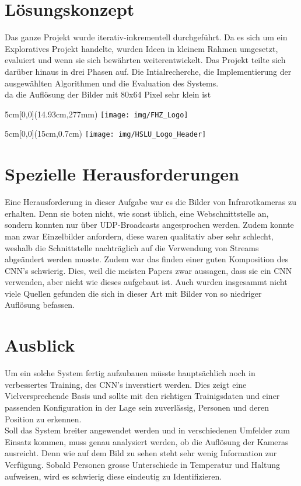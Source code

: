 \documentclass[
	a4paper
]{scrartcl}
\begin{document}
\section{Lösungskonzept}
Das ganze Projekt wurde iterativ-inkrementell durchgeführt. Da es sich um ein Exploratives Projekt handelte, wurden Ideen in kleinem Rahmen umgesetzt, evaluiert und wenn sie sich bewährten weiterentwickelt. Das Projekt teilte sich darüber hinaus in drei Phasen auf. Die Intialrecherche, die Implementierung der ausgewählten Algorithmen und die Evaluation des Systems.\\
da die Auflösung der Bilder mit 80x64 Pixel sehr klein ist 

\begin{textblock*}{5cm}[0,0](14.93cm,277mm)
	\texttt{[image: img/FHZ\_Logo]}
\end{textblock*}

\newpage

\begin{textblock*}{5cm}[0,0](15cm,0.7cm)
	\texttt{[image: img/HSLU\_Logo\_Header]}
\end{textblock*}


\section{Spezielle Herausforderungen}
Eine Herausforderung in dieser Aufgabe war es die Bilder von Infrarotkameras zu erhalten. Denn sie boten nicht, wie sonst üblich, eine Webschnittstelle an, sondern konnten nur über UDP-Broadcasts angesprochen werden. Zudem konnte man zwar Einzelbilder anfordern, diese waren qualitativ aber sehr schlecht, weshalb die Schnittstelle nachträglich auf die Verwendung von Streams abgeändert werden musste.
Zudem war das finden einer guten Komposition des CNN's schwierig. Dies, weil die meisten Papers zwar aussagen, dass sie ein CNN verwenden, aber nicht wie dieses aufgebaut ist. Auch wurden insgesammt nicht viele Quellen gefunden die sich in dieser Art mit Bilder von so niedriger Auflösung befassen.

\section{Ausblick}
Um ein solche System fertig aufzubauen müsste hauptsächlich noch in verbessertes Training, des CNN's inverstiert werden. Dies zeigt eine Vielversprechende Basis und sollte mit den richtigen Trainigsdaten und einer passenden Konfiguration in der Lage sein zuverlässig, Personen und deren Position zu erkennen.\\
Soll das System breiter angewendet werden und in verschiedenen Umfelder zum Einsatz kommen, muss genau analysiert werden, ob die Auflösung der Kameras ausreicht. Denn wie auf dem Bild zu sehen steht sehr wenig Information zur Verfügung. Sobald Personen grosse Unterschiede in Temperatur und Haltung aufweisen, wird es schwierig diese eindeutig zu Identifizieren.
\end{document}
